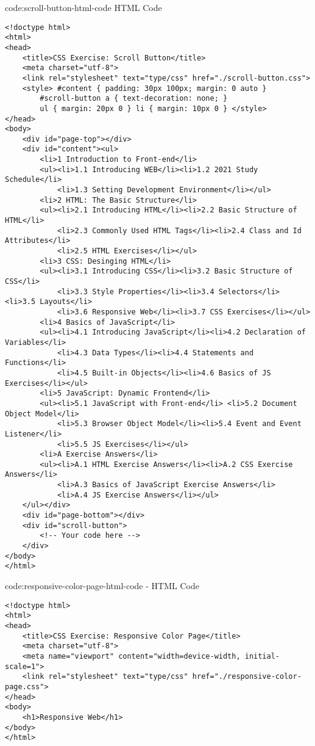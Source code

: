 \begin{codeenv}{code:scroll-button-html-code}{ HTML Code}
\begin{verbatim}
<!doctype html>
<html>
<head>
    <title>CSS Exercise: Scroll Button</title>
    <meta charset="utf-8">
    <link rel="stylesheet" text="type/css" href="./scroll-button.css">
    <style> #content { padding: 30px 100px; margin: 0 auto }
        #scroll-button a { text-decoration: none; }
        ul { margin: 20px 0 } li { margin: 10px 0 } </style>
</head>
<body>
    <div id="page-top"></div>
    <div id="content"><ul>
        <li>1 Introduction to Front-end</li>
        <ul><li>1.1 Introducing WEB</li><li>1.2 2021 Study Schedule</li>
            <li>1.3 Setting Development Environment</li></ul>
        <li>2 HTML: The Basic Structure</li>
        <ul><li>2.1 Introducing HTML</li><li>2.2 Basic Structure of HTML</li>
            <li>2.3 Commonly Used HTML Tags</li><li>2.4 Class and Id Attributes</li>
            <li>2.5 HTML Exercises</li></ul>
        <li>3 CSS: Desinging HTML</li>
        <ul><li>3.1 Introducing CSS</li><li>3.2 Basic Structure of CSS</li>
            <li>3.3 Style Properties</li><li>3.4 Selectors</li> <li>3.5 Layouts</li>
            <li>3.6 Responsive Web</li><li>3.7 CSS Exercises</li></ul>
        <li>4 Basics of JavaScript</li>
        <ul><li>4.1 Introducing JavaScript</li><li>4.2 Declaration of Variables</li>
            <li>4.3 Data Types</li><li>4.4 Statements and Functions</li>
            <li>4.5 Built-in Objects</li><li>4.6 Basics of JS Exercises</li></ul>
        <li>5 JavaScript: Dynamic Frontend</li>
        <ul><li>5.1 JavaScript with Front-end</li> <li>5.2 Document Object Model</li>
            <li>5.3 Browser Object Model</li><li>5.4 Event and Event Listener</li>
            <li>5.5 JS Exercises</li></ul>
        <li>A Exercise Answers</li>
        <ul><li>A.1 HTML Exercise Answers</li><li>A.2 CSS Exercise Answers</li>
            <li>A.3 Basics of JavaScript Exercise Answers</li>
            <li>A.4 JS Exercise Answers</li></ul>
    </ul></div>
    <div id="page-bottom"></div>
    <div id="scroll-button">
        <!-- Your code here -->
    </div>
</body>
</html>
\end{verbatim}
\end{codeenv}

\begin{codeenv}{code:responsive-color-page-html-code}{ - HTML Code}
\begin{verbatim}
<!doctype html>
<html>
<head>
    <title>CSS Exercise: Responsive Color Page</title>
    <meta charset="utf-8">
    <meta name="viewport" content="width=device-width, initial-scale=1">
    <link rel="stylesheet" text="type/css" href="./responsive-color-page.css">
</head>
<body>
    <h1>Responsive Web</h1>
</body>
</html>
\end{verbatim}
\end{codeenv}

